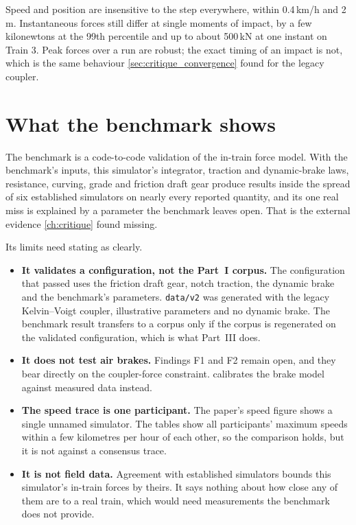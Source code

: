 Speed and position are insensitive to the step everywhere, within 0.4\,km/h and 2\,m. Instantaneous forces still differ at single moments of impact, by a few kilonewtons at the 99th percentile and up to about 500\,kN at one instant on Train 3. Peak forces over a run are robust; the exact timing of an impact is not, which is the same behaviour \cref{sec:critique_convergence} found for the legacy coupler.

\section{What the benchmark shows}
\label{sec:bench_scope}

The benchmark is a code-to-code validation of the in-train force model. With the benchmark's inputs, this simulator's integrator, traction and dynamic-brake laws, resistance, curving, grade and friction draft gear produce results inside the spread of six established simulators on nearly every reported quantity, and its one real miss is explained by a parameter the benchmark leaves open. That is the external evidence \cref{ch:critique} found missing.

Its limits need stating as clearly.

\begin{itemize}
    \item \textbf{It validates a configuration, not the Part~I corpus.} The configuration that passed uses the friction draft gear, notch traction, the dynamic brake and the benchmark's parameters. \texttt{data/v2} was generated with the legacy Kelvin--Voigt coupler, illustrative parameters and no dynamic brake. The benchmark result transfers to a corpus only if the corpus is regenerated on the validated configuration, which is what Part~III does.
    \item \textbf{It does not test air brakes.} Findings F1 and F2 remain open, and they bear directly on the coupler-force constraint.  calibrates the brake model against measured data instead.
    \item \textbf{The speed trace is one participant.} The paper's speed figure shows a single unnamed simulator. The tables show all participants' maximum speeds within a few kilometres per hour of each other, so the comparison holds, but it is not against a consensus trace.
    \item \textbf{It is not field data.} Agreement with established simulators bounds this simulator's in-train forces by theirs. It says nothing about how close any of them are to a real train, which would need measurements the benchmark does not provide.
\end{itemize}

